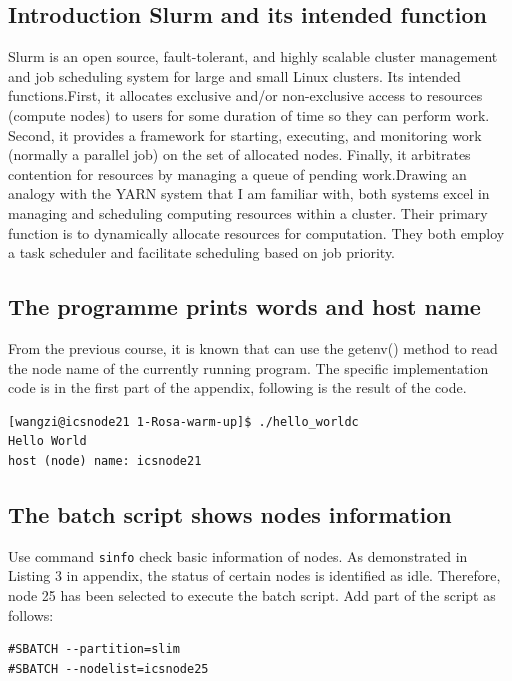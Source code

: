 \documentclass[unicode,11pt,a4paper,oneside,numbers=endperiod,openany]{scrartcl}
\begin{document}
\subsection{Introduction Slurm and its intended function}
Slurm is an open source, fault-tolerant, and highly scalable cluster management and job scheduling system for large and small Linux clusters. Its intended functions.First, it allocates exclusive and/or non-exclusive access to resources (compute nodes) to users for some duration of time so they can perform work. Second, it provides a framework for starting, executing, and monitoring work (normally a parallel job) on the set of allocated nodes. Finally, it arbitrates contention for resources by managing a queue of pending work\cite{slurmDoc}.Drawing an analogy with the YARN system that I am familiar with, both systems excel in managing and scheduling computing resources within a cluster. Their primary function is to dynamically allocate resources for computation. They both employ a task scheduler and facilitate scheduling based on job priority.

\subsection{The programme prints words and host name}
From the previous course, it is known that can use the getenv() method to read the node name of the currently running program. The specific implementation code is in the first part of the appendix, following is the result of the code.


\begin{lstlisting}[style=mystyle, language=MyBash, caption={Result of Hello World Program}]
[wangzi@icsnode21 1-Rosa-warm-up]$ ./hello_worldc
Hello World
host (node) name: icsnode21
\end{lstlisting}

\subsection{The batch script shows nodes information}
Use command \texttt{sinfo} check basic information of nodes. As demonstrated in Listing 3 in appendix, the status of certain nodes is identified as idle. Therefore, node 25 has been selected to execute the batch script. Add part of the script as follows:
\begin{lstlisting}[style=mystyle, language=MyBatch, caption={Specify the node to run}]
#SBATCH --partition=slim                 
#SBATCH --nodelist=icsnode25
\end{lstlisting}
\end{document}
